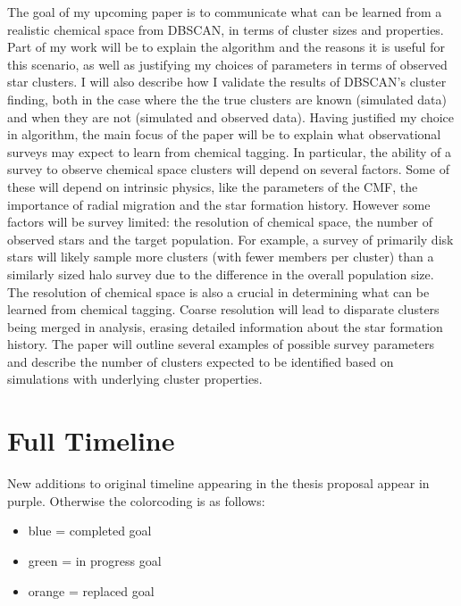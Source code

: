 \documentclass[11pt]{article}
\begin{document}
The goal of my upcoming paper is to communicate what can be learned from a realistic chemical space from DBSCAN, in terms of cluster sizes and properties. Part of my work will be to explain the algorithm and the reasons it is useful for this scenario, as well as justifying my choices of parameters in terms of observed star clusters. I will also describe how I validate the results of DBSCAN's cluster finding, both in the case where the the true clusters are known (simulated data) and when they are not (simulated and observed data). Having justified my choice in algorithm, the main focus of the paper will be to explain what observational surveys may expect to learn from chemical tagging. In particular, the ability of a survey to observe chemical space clusters will depend on several factors. Some of these will depend on intrinsic physics, like the parameters of the CMF, the importance of radial migration and the star formation history. However some factors will be survey limited: the resolution of chemical space, the number of observed stars and the target population. For example, a survey of primarily disk stars will likely sample more clusters (with fewer members per cluster) than a similarly sized halo survey due to the difference in the overall population size. The resolution of chemical space is also a crucial in determining what can be learned from chemical tagging. Coarse resolution will lead to disparate clusters being merged in analysis, erasing detailed information about the star formation history. The paper will outline several examples of possible survey parameters and describe the number of clusters expected to be identified based on simulations with underlying cluster properties.

\section*{Full Timeline}

New additions to original timeline appearing in the thesis proposal appear in {\color{Mulberry} purple}. Otherwise the colorcoding is as follows:
    
    \begin{itemize}
    	\item {\color{RoyalBlue}blue} = completed goal
    	\item {\color{ForestGreen} green} = in progress goal
    	\item {\color{BurntOrange} orange} = replaced goal
    \end{itemize}
\end{document}

